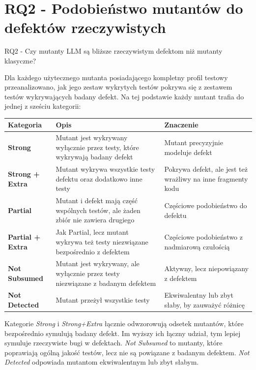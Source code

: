 \documentclass[12pt,a4paper,oldfontcommands]{memoir}
\theoremstyle{plain}
\theoremstyle{definition}
\theoremstyle{remark}
\begin{document}
    \section{RQ2 - Podobieństwo mutantów do defektów rzeczywistych}

    RQ2 - Czy mutanty LLM są bliższe rzeczywistym defektom niż mutanty klasyczne?

    Dla każdego użytecznego mutanta posiadającego kompletny profil testowy przeanalizowano, jak jego zestaw wykrytych testów pokrywa się z zestawem testów wykrywających badany defekt.
    Na tej podstawie każdy mutant trafia do jednej z sześciu kategorii:

    \begin{table}[H]
        \centering
        \small
        \begin{tabular}{|l|p{6cm}|p{4.5cm}|}
            \hline
            Kategoria & Opis & Znaczenie \\ \hline
            \textbf{Strong} & Mutant jest wykrywany wyłącznie przez testy, które wykrywają badany defekt & Mutant precyzyjnie modeluje defekt \\ \hline
            \textbf{Strong + Extra} & Mutant wykrywa wszystkie testy defektu oraz dodatkowo inne testy & Pokrywa defekt, ale jest też wrażliwy na inne fragmenty kodu \\ \hline
            \textbf{Partial} & Mutant i defekt mają część wspólnych testów, ale żaden zbiór nie zawiera drugiego & Częściowe podobieństwo do defektu \\ \hline
            \textbf{Partial + Extra} & Jak Partial, lecz mutant wykrywa też testy niezwiązane bezpośrednio z defektem & Częściowe podobieństwo z nadmiarową czułością \\ \hline
            \textbf{Not Subsumed} & Mutant jest wykrywany, ale wyłącznie przez testy niezwiązane z badanym defektem & Aktywny, lecz niepowiązany z defektem \\ \hline
            \textbf{Not Detected} & Mutant przeżył wszystkie testy & Ekwiwalentny lub zbyt słaby, by zauważyć różnicę \\ \hline
        \end{tabular}
    \end{table}

    Kategorie \textit{Strong} i \textit{Strong+Extra} łącznie odwzorowują odsetek mutantów, które bezpośrednio symulują badany defekt.
    Im wyższy ich łączny udział, tym lepiej symuluje rzeczywiste bugi w defektach.
    \textit{Not Subsumed} to mutanty, które poprawiają ogólną jakość testów, lecz nie są powiązane z badanym defektem.
    \textit{Not Detected} odpowiada mutantom ekwiwalentnym lub zbyt słabym.
\end{document}
